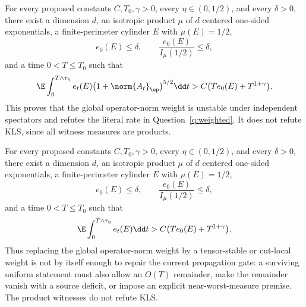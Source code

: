 \documentclass[../../main.tex]{subfiles}
\begin{document}
\begin{proposition}
\label{prop:weighted-spectator-obstruction}
For every proposed constants $C,T_0,\gamma>0$, every $\eta\in(0,1/2)$, and every
$\delta>0$, there exist a dimension $d$, an isotropic product $\mu$ of $d$ centered
one-sided exponentials, a finite-perimeter cylinder $E$ with $\mu(E)=1/2$,
\[
  e_0(E)\le\delta,
  \qquad
  \frac{e_0(E)}{I_\mu(1/2)}\le\delta,
\]
and a time $0<T\le T_0$ such that
\[
  \E\int_0^{T\wedge\tau_\eta}
  e_t(E)\bigl(1+\norm{A_t}_\op\bigr)^{5/2}\dd t
  >C\bigl(Te_0(E)+T^{1+\gamma}\bigr).
\]
This proves that the global operator-norm weight is unstable under independent spectators and
refutes the literal rate in Question~\ref{q:weighted}. It does not refute KLS, since all witness
measures are products.
\end{proposition}

\begin{proposition}
\label{prop:spectator-excess-rate-obstruction}
For every proposed constants $C,T_0,\gamma>0$, every $\eta\in(0,1/2)$, and every
$\delta>0$, there exist a dimension $d$, an isotropic product $\mu$ of $d$ centered
one-sided exponentials, a finite-perimeter cylinder $E$ with $\mu(E)=1/2$,
\[
  e_0(E)\le\delta,
  \qquad
  \frac{e_0(E)}{I_\mu(1/2)}\le\delta,
\]
and a time $0<T\le T_0$ such that
\[
  \E\int_0^{T\wedge\tau_\eta}e_t(E)\dd t
  >C\bigl(Te_0(E)+T^{1+\gamma}\bigr).
\]
Thus replacing the global operator-norm weight by a tensor-stable or cut-local weight is not
by itself enough to repair the current propagation gate: a surviving uniform statement must
also allow an $O(T)$ remainder, make the remainder vanish with a source deficit, or impose an
explicit near-worst-measure premise. The product witnesses do not refute KLS.
\end{proposition}
\end{document}
